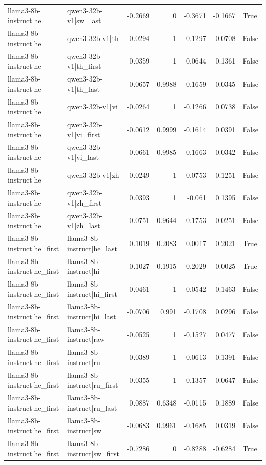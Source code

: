 \begin{table}
\begin{tabular}{l l r r r r l}
llama3-8b-instruct|he & qwen3-32b-v1|sw_last & -0.2669 & 0 & -0.3671 & -0.1667 & True \\
llama3-8b-instruct|he & qwen3-32b-v1|th & -0.0294 & 1 & -0.1297 & 0.0708 & False \\
llama3-8b-instruct|he & qwen3-32b-v1|th_first & 0.0359 & 1 & -0.0644 & 0.1361 & False \\
llama3-8b-instruct|he & qwen3-32b-v1|th_last & -0.0657 & 0.9988 & -0.1659 & 0.0345 & False \\
llama3-8b-instruct|he & qwen3-32b-v1|vi & -0.0264 & 1 & -0.1266 & 0.0738 & False \\
llama3-8b-instruct|he & qwen3-32b-v1|vi_first & -0.0612 & 0.9999 & -0.1614 & 0.0391 & False \\
llama3-8b-instruct|he & qwen3-32b-v1|vi_last & -0.0661 & 0.9985 & -0.1663 & 0.0342 & False \\
llama3-8b-instruct|he & qwen3-32b-v1|zh & 0.0249 & 1 & -0.0753 & 0.1251 & False \\
llama3-8b-instruct|he & qwen3-32b-v1|zh_first & 0.0393 & 1 & -0.061 & 0.1395 & False \\
llama3-8b-instruct|he & qwen3-32b-v1|zh_last & -0.0751 & 0.9644 & -0.1753 & 0.0251 & False \\
llama3-8b-instruct|he_first & llama3-8b-instruct|he_last & 0.1019 & 0.2083 & 0.0017 & 0.2021 & True \\
llama3-8b-instruct|he_first & llama3-8b-instruct|hi & -0.1027 & 0.1915 & -0.2029 & -0.0025 & True \\
llama3-8b-instruct|he_first & llama3-8b-instruct|hi_first & 0.0461 & 1 & -0.0542 & 0.1463 & False \\
llama3-8b-instruct|he_first & llama3-8b-instruct|hi_last & -0.0706 & 0.991 & -0.1708 & 0.0296 & False \\
llama3-8b-instruct|he_first & llama3-8b-instruct|raw & -0.0525 & 1 & -0.1527 & 0.0477 & False \\
llama3-8b-instruct|he_first & llama3-8b-instruct|ru & 0.0389 & 1 & -0.0613 & 0.1391 & False \\
llama3-8b-instruct|he_first & llama3-8b-instruct|ru_first & -0.0355 & 1 & -0.1357 & 0.0647 & False \\
llama3-8b-instruct|he_first & llama3-8b-instruct|ru_last & 0.0887 & 0.6348 & -0.0115 & 0.1889 & False \\
llama3-8b-instruct|he_first & llama3-8b-instruct|sw & -0.0683 & 0.9961 & -0.1685 & 0.0319 & False \\
llama3-8b-instruct|he_first & llama3-8b-instruct|sw_first & -0.7286 & 0 & -0.8288 & -0.6284 & True \\

\end{tabular}
\end{table}
